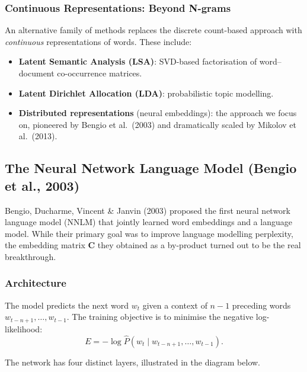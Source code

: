 \documentclass[11pt,a4paper]{article}
\begin{document}
\subsubsection{Continuous Representations: Beyond N-grams}

An alternative family of methods replaces the discrete count-based approach with \emph{continuous} representations of words. These include:
\begin{itemize}
  \item \textbf{Latent Semantic Analysis (LSA)}: SVD-based factorisation of word--document co-occurrence matrices.
  \item \textbf{Latent Dirichlet Allocation (LDA)}: probabilistic topic modelling.
  \item \textbf{Distributed representations} (neural embeddings): the approach we focus on, pioneered by Bengio et al.\ (2003) and dramatically scaled by Mikolov et al.\ (2013).
\end{itemize}

\subsection{The Neural Network Language Model (Bengio et al., 2003)}
\label{sec:nnlm}

Bengio, Ducharme, Vincent \& Janvin (2003) proposed the first neural network language model (NNLM) that jointly learned word embeddings and a language model. While their primary goal was to improve language modelling perplexity, the embedding matrix $\mathbf{C}$ they obtained as a by-product turned out to be the real breakthrough.

\subsubsection{Architecture}

The model predicts the next word $w_t$ given a context of $n-1$ preceding words $w_{t-n+1}, \ldots, w_{t-1}$. The training objective is to minimise the negative log-likelihood:
\[
  E = -\log \hat{P}(w_t \mid w_{t-n+1}, \ldots, w_{t-1}).
\]

The network has four distinct layers, illustrated in the diagram below.
\end{document}
